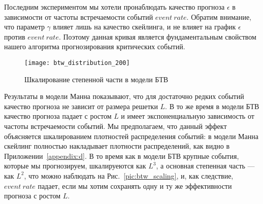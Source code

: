 Последним экспериментом мы хотели пронаблюдать качество прогноза $\epsilon$ в зависимости от частоты встречаемости событий $event\ rate$. Обратим внимание, что параметр $\gamma$ влияет лишь на качество скейлинга, и не влияет на график $\epsilon$ против $event\ rate$. Поэтому данная кривая является фундаментальным свойством нашего алгоритма прогнозирования критических событий.

\begin{figure}[h]
	\centering
	\texttt{[image: btw\_distribution\_200]}
	\caption{Шкалирование степенной части в модели БТВ}\label{pic:btw_scaling}
\end{figure}

Результаты в модели Манна показывают, что для достаточно редких событий качество прогноза не зависит от размера решетки $L$. В то же время в модели БТВ качество прогноза падает с ростом $L$ и имеет экспоненциальную зависимость от частоты встречаемости событий. Мы предполагаем, что данный эффект объясняется шкалированием плотностей распределения событий: в модели Манна скейлинг полностью накладывает плотности распределений, как видно в Приложении~\eqref{appendix:d}. В то время как в модели БТВ крупные события, которые мы прогнозируем, шкалируеются как $L^3$, а основная степенная часть --- как $L^2$, что можно наблюдать на Рис.~\eqref{pic:btw_scaling}, и, как следствие, $event\ rate$ падает, если мы хотим сохранять одну и ту же эффективности прогноза с ростом $L$.

